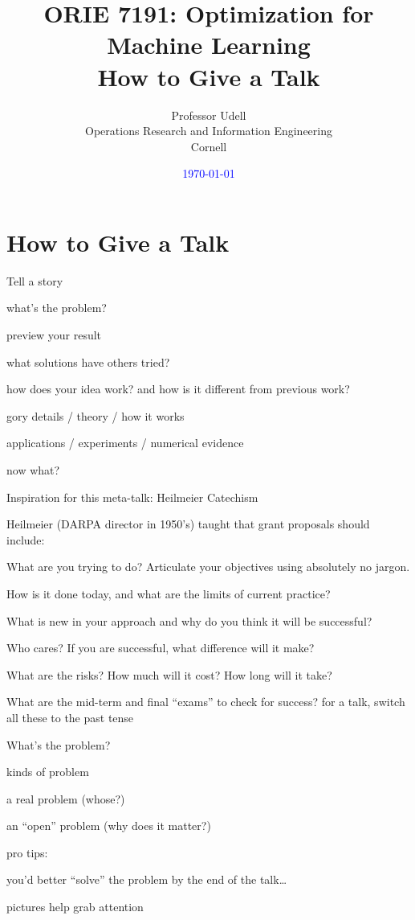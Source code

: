 \documentclass[presentation,xcolor={usenames,dvipsnames}]{beamer}
\title{ORIE 7191: Optimization for Machine Learning\\[2ex]
       How to Give a Talk}
\date{\textcolor{blue}{\today}}
\author{Professor Udell \\[1ex]
Operations Research and Information Engineering \\
Cornell}
\begin{document}
\begin{frame}
\titlepage
\end{frame}

\section{How to Give a Talk}

\begin{frame}{Tell a story}

\bit
\item what's the problem?
\item preview your result
\item what solutions have others tried?
\item how does your idea work? and how is it different from previous work?
\item gory details / theory / how it works
\item applications / experiments / numerical evidence
\item now what?
\eit

\end{frame}

\begin{frame}{Inspiration for this meta-talk: Heilmeier Catechism}

Heilmeier (DARPA director in 1950's) taught that grant proposals should include:
\bit
\item What are you trying to do? Articulate your objectives using absolutely no jargon.
\item How is it done today, and what are the limits of current practice?
\item What is new in your approach and why do you think it will be successful?
\item Who cares? If you are successful, what difference will it make?
\item What are the risks? How much will it cost? How long will it take?
\item What are the mid-term and final ``exams'' to check for success?
\eit
for a talk, switch all these to the past tense

\end{frame}

\begin{frame}{What's the problem?}

kinds of problem
\bit
\item a real problem (whose?)
\item an ``open'' problem (why does it matter?)
\eit

pro tips:
\bit
\item you'd better ``solve'' the problem by the end of the talk\ldots
\item pictures help grab attention
\eit

\end{frame}
\end{document}
